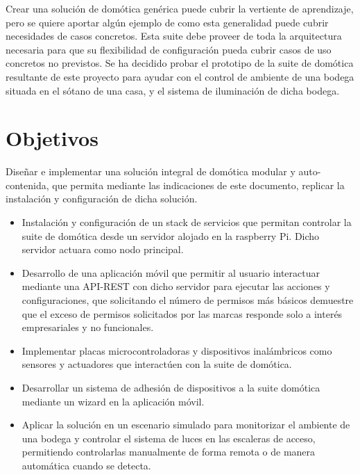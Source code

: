\vspace{1cm}

Crear una solución de domótica genérica puede cubrir la vertiente de aprendizaje, pero se quiere aportar algún ejemplo de como esta generalidad puede cubrir necesidades de casos concretos. Esta suite debe proveer de toda la arquitectura necesaria para que su flexibilidad de configuración pueda cubrir casos de uso concretos no previstos. Se ha decidido probar el prototipo de la suite de domótica resultante de este proyecto para ayudar con el control de ambiente de una bodega situada en el sótano de una casa, y el sistema de iluminación de dicha bodega.

\section{Objetivos}
\label{ch:Capitulo1.1}

Diseñar e implementar una solución integral de domótica modular y auto-contenida, que permita mediante las indicaciones de este documento, replicar la instalación y configuración de dicha solución.
\begin{itemize}
  \item Instalación y configuración de un stack de servicios que permitan controlar la suite de domótica desde un servidor alojado en la raspberry Pi. Dicho servidor actuara como nodo principal.

  \item Desarrollo de una aplicación móvil que permitir al usuario interactuar mediante una API-REST con dicho servidor para ejecutar las acciones y configuraciones, que solicitando el número de permisos más básicos demuestre que el exceso de permisos solicitados por las marcas responde solo a interés empresariales y no funcionales.

  \item Implementar placas microcontroladoras y dispositivos inalámbricos como sensores y actuadores que interactúen con la suite de domótica.

  \item Desarrollar un sistema de adhesión de dispositivos a la suite domótica mediante un wizard en la aplicación móvil.
  
  \item Aplicar la solución en un escenario simulado para monitorizar el ambiente de una bodega y controlar el sistema de luces en las escaleras de acceso, permitiendo controlarlas manualmente de forma remota o de manera automática cuando se detecta.
\end{itemize}

